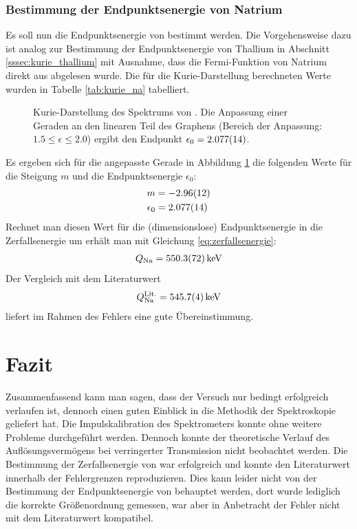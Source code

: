 \documentclass[11pt, a4paper]{article}
\numberwithin{equation}{section}
\begin{document}
\subsubsection{Bestimmung der Endpunktsenergie von Natrium}
Es soll nun die Endpunktsenergie von  bestimmt werden.
Die Vorgehensweise dazu ist analog zur Bestimmung der Endpunktsenergie von Thallium in Abschnitt \ref{sssec:kurie_thallium} mit Ausnahme, dass die Fermi-Funktion von Natrium direkt aus \cite{riezler} abgelesen wurde.
Die für die Kurie-Darstellung berechneten Werte wurden in Tabelle \ref{tab:kurie_na} tabelliert.
\begin{figure}[h]
	\centering
	
	\caption{Kurie-Darstellung des Spektrums von . Die Anpassung einer Geraden an den linearen Teil des Graphens (Bereich der Anpassung: $\num{1.5} \leq \epsilon \leq {2.0}$) ergibt den Endpunkt $\epsilon_0 = \num{2.077 +- 0.014}$.}
	\label{fig:natrium_kurie}
\end{figure}
Es ergeben sich für die angepasste Gerade in Abbildung \ref{fig:natrium_kurie} die folgenden Werte für die Steigung $m$ und die Endpunktsenergie $\epsilon_0$:
\begin{align*}
	m &= \num{-2.96+- 0.12} \\
	\epsilon_0 &= \num{2.077 +- 0.014}
\end{align*}
Rechnet man diesen Wert für die (dimensionslose) Endpunktsenergie in die Zerfallsenergie um erhält man mit Gleichung \ref{eq:zerfallsenergie}:
\begin{align*}
Q_\mathrm{Na} = \SI{550.3+-7.2}{\kilo\electronvolt}
\end{align*}
Der Vergleich mit dem Literaturwert \cite{na_literatur}
\begin{align*}
	Q^{\mathrm{Lit.}}_\mathrm{Na} = \SI{545.7 +- 0.4}{\kilo\electronvolt}
\end{align*}
liefert im Rahmen des Fehlers eine gute Übereinstimmung.
\FloatBarrier
\section{Fazit}
Zusammenfassend kann man sagen, dass der Versuch nur bedingt erfolgreich verlaufen ist, dennoch einen guten Einblick in die Methodik der Spektroskopie geliefert hat.
Die Impulskalibration des Spektrometers konnte ohne weitere Probleme durchgeführt werden.
Dennoch konnte der theoretische Verlauf des Auflösungsvermögens bei verringerter Transmission nicht beobachtet werden.
Die Bestimmung der Zerfallsenergie von  war erfolgreich und konnte den Literaturwert innerhalb der Fehlergrenzen reproduzieren.
Dies kann leider nicht von der Bestimmung der Endpunktsenergie von  behauptet werden, dort wurde lediglich die korrekte Größenordnung gemessen, war aber in Anbetracht der Fehler nicht mit dem Literaturwert kompatibel.
\end{document}
